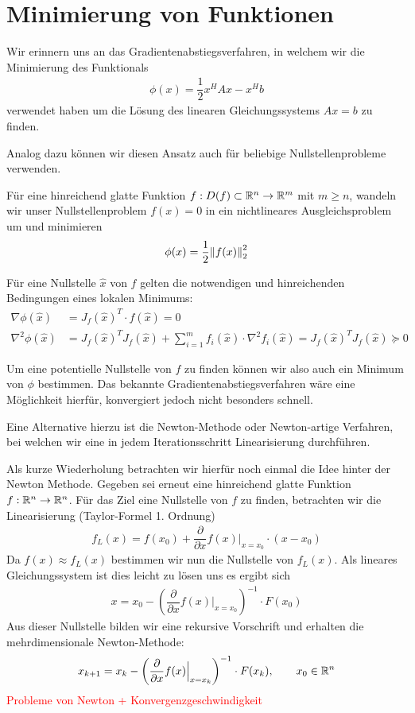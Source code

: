 
\section{Minimierung von Funktionen}
Wir erinnern uns an das Gradientenabstiegsverfahren, in welchem wir die Minimierung des Funktionals 
%
\begin{align*}
  \phi(x) = \dfrac{1}{2}x^HAx - x^Hb 
\end{align*}
%
verwendet haben um die Lösung des linearen Gleichungssystems $Ax=b$ zu finden. 

Analog dazu können wir diesen Ansatz auch für beliebige Nullstellenprobleme verwenden. 

Für eine hinreichend glatte Funktion $f:D(f)\subset \mathbb R^n\to\mathbb R^m$ mit $m\geq n$, 
wandeln wir unser Nullstellenproblem $f(x)=0$ in ein nichtlineares Ausgleichsproblem um und minimieren 
%
\begin{align*}
  \phi(x) = \dfrac{1}{2}\vertn{2}{f(x)}_2^2
\end{align*}

Für eine Nullstelle $\hat{x}$ von $f$ gelten die notwendigen und hinreichenden Bedingungen eines lokalen Minimums:
%
\begin{align*}
  \nabla \phi(\hat{x}) 
  &= J_f(\hat{x})^T \cdot f(\hat{x}) = 0\\
  \nabla^2 \phi(\hat{x}) 
  &= J_f(\hat{x})^TJ_f(\hat{x}) + \sum_{i=1}^{m} f_i(\hat{x})\cdot \nabla^2 f_i(\hat{x}) 
  = J_f(\hat{x})^TJ_f(\hat{x}) \succeq 0
\end{align*}
%

Um eine potentielle Nullstelle von $f$ zu finden können wir also auch ein Minimum von $\phi$ bestimmen. Das 
bekannte Gradientenabstiegsverfahren wäre eine Möglichkeit hierfür, konvergiert jedoch nicht besonders schnell.

Eine Alternative hierzu ist die Newton-Methode oder Newton-artige Verfahren, bei welchen wir eine in jedem 
Iterationsschritt Linearisierung durchführen.

Als kurze Wiederholung betrachten wir hierfür noch einmal die Idee hinter der Newton Methode. Gegeben sei erneut 
eine hinreichend glatte Funktion $f:\mathbb R^n\to\mathbb R^n$. Für das Ziel eine Nullstelle von $f$ zu finden, betrachten wir 
die Linearisierung (Taylor-Formel 1. Ordnung)
%
\begin{align*}
  f_L(x) = f(x_0) + \dfrac{\partial }{\partial x} f(x) \Big|_{x=x_0}\cdot (x-x_0)
\end{align*}
%
Da $f(x) \approx f_L(x)$ bestimmen wir nun die Nullstelle von $f_L(x)$. Als lineares Gleichungssystem ist dies leicht 
zu lösen uns es ergibt sich 
%
\begin{align*}
  x = x_0 - \left(\dfrac{\partial }{\partial x} f(x) \Big|_{x=x_0}\right)^{-1}\cdot F(x_0)
\end{align*}
%
Aus dieser Nullstelle bilden wir eine rekursive Vorschrift und erhalten die mehrdimensionale Newton-Methode:
%
\begin{align*}
  x_{k+1} = x_k - \left(\dfrac{\partial }{\partial x} f(x) \Big|_{x=x_k}\right)^{-1}\cdot F(x_k),
  \qquad x_0\in\mathbb R^n
\end{align*}
%
\textcolor{red}{Probleme von Newton + Konvergenzgeschwindigkeit}